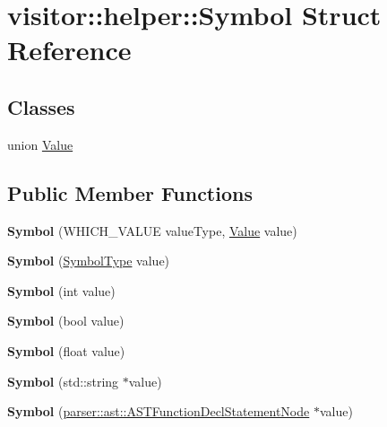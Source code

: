\hypertarget{structvisitor_1_1helper_1_1Symbol}{}\section{visitor\+:\+:helper\+:\+:Symbol Struct Reference}
\label{structvisitor_1_1helper_1_1Symbol}
\subsection*{Classes}
\begin{DoxyCompactItemize}
\item 
union \hyperlink{unionvisitor_1_1helper_1_1Symbol_1_1Value}{Value}
\end{DoxyCompactItemize}
\subsection*{Public Member Functions}
\begin{DoxyCompactItemize}
\item 
\mbox{\label{structvisitor_1_1helper_1_1Symbol_ad32b28990e36de9ca8bcb64a9775c255}} 
{\bfseries Symbol} (W\+H\+I\+C\+H\+\_\+\+V\+A\+L\+UE value\+Type, \hyperlink{unionvisitor_1_1helper_1_1Symbol_1_1Value}{Value} value)
\item 
\mbox{\label{structvisitor_1_1helper_1_1Symbol_a2f447584c211d452dc0fe79b80c2ca2c}} 
{\bfseries Symbol} (\hyperlink{ASTVariableDeclStatementNode_8h_a1e8e1bde0729627e3a22ffa858d5f3b9}{Symbol\+Type} value)
\item 
\mbox{\label{structvisitor_1_1helper_1_1Symbol_a12aa40b952eaa6a64b148ff3dc6ad88a}} 
{\bfseries Symbol} (int value)
\item 
\mbox{\label{structvisitor_1_1helper_1_1Symbol_ae05fe0ccd5e107992b07f5939811dbb0}} 
{\bfseries Symbol} (bool value)
\item 
\mbox{\label{structvisitor_1_1helper_1_1Symbol_a8ed20173f3a8d4f3f28517170b8f3c6e}} 
{\bfseries Symbol} (float value)
\item 
\mbox{\label{structvisitor_1_1helper_1_1Symbol_a88580214c3b94b1a4585b02ae3efe6bf}} 
{\bfseries Symbol} (std\+::string $\ast$value)
\item 
\mbox{\label{structvisitor_1_1helper_1_1Symbol_a06a4138c8b736f8ed7e3878abfe44f93}} 
{\bfseries Symbol} (\hyperlink{classparser_1_1ast_1_1ASTFunctionDeclStatementNode}{parser\+::ast\+::\+A\+S\+T\+Function\+Decl\+Statement\+Node} $\ast$value)
\end{DoxyCompactItemize}
